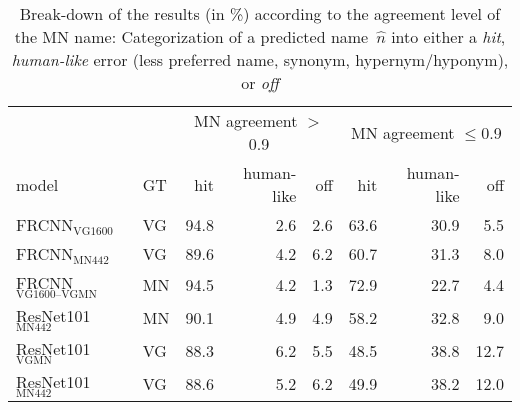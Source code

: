 \begin{table*}[t]
\centering
	\small
\begin{tabular}{ll|rrr|rrr}
\toprule
&  & \multicolumn{3}{c|}{MN agreement $>$ 0.9} & \multicolumn{3}{c}{MN agreement $\leq$0.9}\\
                         model &  GT &  hit &  human-like &  off &  hit &  human-like &  off \\
\midrule
       FRCNN$_{\text{VG1600}}$ &  VG &   94.8 &           2.6 &      2.6 &   63.6 &          30.9 &      5.5 \\
        FRCNN$_{\text{MN442}}$ &  VG &   89.6 &           4.2 &      6.2 &   60.7 &          31.3 &      8.0 \\
        \midrule
 	FRCNN$_{\text{VG1600--VGMN}}$ &  MN &   94.5 &           4.2 &      1.3 &   72.9 &          22.7 &      4.4 \\
 \midrule
 ResNet101$_{\text{MN442}}$ &  MN &   90.1 &           4.9 &      4.9 &   58.2 &          32.8 &      9.0 \\
     ResNet101$_{\text{VGMN}}$ &  VG &   88.3 &           6.2 &      5.5 &   48.5 &          38.8 &     12.7 \\
    ResNet101$_{\text{MN442}}$ &  VG &   88.6 &           5.2 &      6.2 &   49.9 &          38.2 &     12.0 \\
\bottomrule
\end{tabular}
\caption{Break-down of the results (in \%) according to the agreement level of the MN name: Categorization of a predicted name\ $\hat{n}$ into either a \textit{hit}, \textit{human-like} error (less preferred name, synonym, hypernym/hyponym), or \textit{off} \label{tab:exp_errors_agreement}}
\end{table*}
